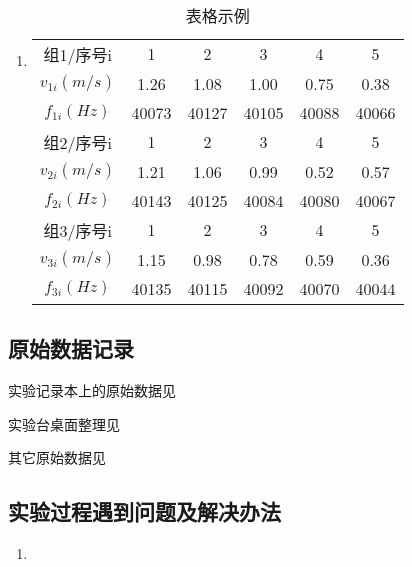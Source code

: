 \documentclass[dvipsnames, svgnames,a4paper,11pt]{article}
\begin{document}
	\subsubsection{}
	\begin{enumerate}
		\item \begin{table}[h]
			\centering
			\caption{表格示例}
			\label{tab:tab1}
			\begin{tabular}{|c|c|c|c|c|c|}
				\hline
				组1/序号i & 1 & 2 & 3 & 4 & 5 \\
				$v_{1i}(m/s)$ & 1.26 & 1.08 & 1.00 & 0.75 & 0.38 \\
				$f_{1i}(Hz)$ & 40073 & 40127 & 40105 & 40088 & 40066 \\
				\hline
				组2/序号i & 1 & 2 & 3 & 4 & 5 \\
				$v_{2i}(m/s)$ & 1.21 & 1.06 & 0.99 & 0.52 & 0.57 \\
				$f_{2i}(Hz)$ & 40143 & 40125 & 40084 & 40080 & 40067 \\
				\hline
				组3/序号i & 1 & 2 & 3 & 4 & 5 \\
				$v_{3i}(m/s)$ & 1.15 & 0.98 & 0.78 & 0.59 & 0.36 \\
				$f_{3i}(Hz)$ & 40135 & 40115 & 40092 & 40070 & 40044 \\
				\hline
			\end{tabular}
		\end{table}		
	\end{enumerate}
	
	
	\clearpage
	\subsection{原始数据记录}
	实验记录本上的原始数据见%
	
	实验台桌面整理见%
	
	其它原始数据见%
	
	\subsection{实验过程遇到问题及解决办法}
	\begin{enumerate}
		\item 
	\end{enumerate}
	
	
	
	\clearpage
	
\end{document}
